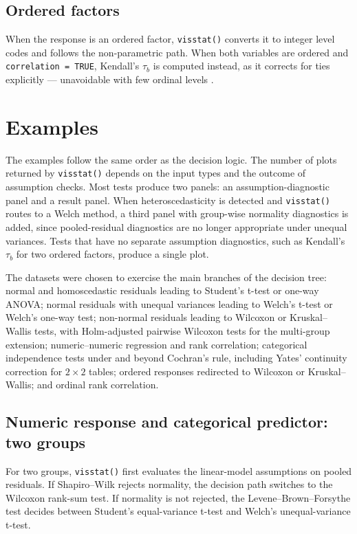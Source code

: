 \subsection{Ordered factors}\label{ordered-factors}

When the response is an ordered factor, \texttt{visstat()} converts it to
integer level codes and follows the non-parametric path. When both
variables are ordered and \texttt{correlation\ =\ TRUE}, Kendall's \(\tau_b\)
\citep{Kendall:1945, Agresti:2010} is computed instead, as it corrects for
ties explicitly --- unavoidable with few ordinal levels \citep{Xu:2013}.

\section{Examples}\label{examples}

The examples follow the same order as the decision logic. The number of
plots returned by \texttt{visstat()} depends on the input types and the outcome
of assumption checks. Most tests produce two panels: an
assumption-diagnostic panel and a result panel. When heteroscedasticity
is detected and \texttt{visstat()} routes to a Welch method, a third panel with
group-wise normality diagnostics is added, since pooled-residual
diagnostics are no longer appropriate under unequal variances. Tests
that have no separate assumption diagnostics, such as Kendall's \(\tau_b\)
for two ordered factors, produce a single plot.

The datasets were chosen to exercise the main branches of the decision
tree: normal and homoscedastic residuals leading to Student's t-test or
one-way ANOVA; normal residuals with unequal variances leading to
Welch's t-test or Welch's one-way test; non-normal residuals leading to
Wilcoxon or Kruskal--Wallis tests, with Holm-adjusted pairwise Wilcoxon
tests for the multi-group extension; numeric--numeric regression and
rank correlation; categorical independence tests under and beyond
Cochran's rule, including Yates' continuity correction for \(2 \times 2\)
tables; ordered responses redirected to Wilcoxon or Kruskal--Wallis;
and ordinal rank correlation.

\subsection{Numeric response and categorical predictor: two groups}\label{numeric-response-and-categorical-predictor-two-groups}

For two groups, \texttt{visstat()} first evaluates the linear-model assumptions
on pooled residuals. If Shapiro--Wilk rejects normality, the decision
path switches to the Wilcoxon rank-sum test. If normality is not
rejected, the Levene--Brown--Forsythe test decides between Student's
equal-variance t-test and Welch's unequal-variance t-test.


